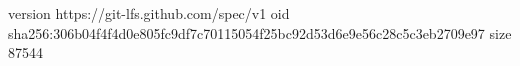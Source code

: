 version https://git-lfs.github.com/spec/v1
oid sha256:306b04f4f4d0e805fc9df7c70115054f25bc92d53d6e9e56c28c5c3eb2709e97
size 87544
